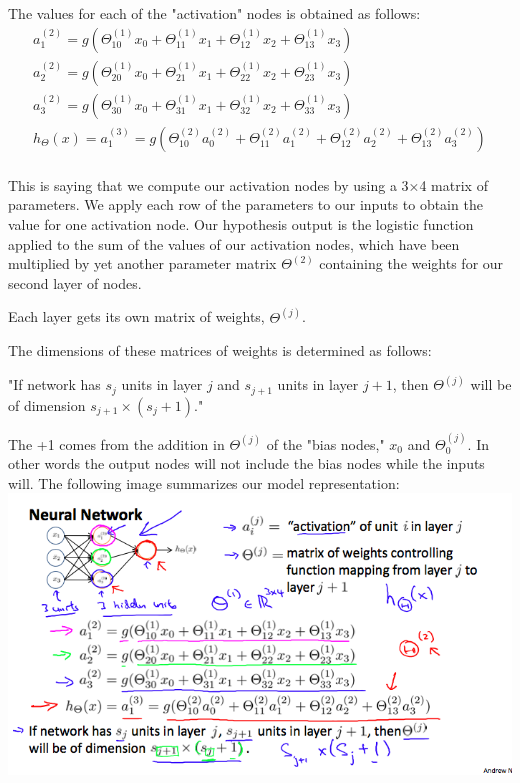 \documentclass{report}
\begin{document}
The values for each of the "activation" nodes is obtained as follows:
\begin{align*} 
	a_1^{(2)} = g(\Theta_{10}^{(1)}x_0 + \Theta_{11}^{(1)}x_1 + \Theta_{12}^{(1)}x_2 + \Theta_{13}^{(1)}x_3) \\ 
	a_2^{(2)} = g(\Theta_{20}^{(1)}x_0 + \Theta_{21}^{(1)}x_1 + \Theta_{22}^{(1)}x_2 + \Theta_{23}^{(1)}x_3) \\ 
	a_3^{(2)} = g(\Theta_{30}^{(1)}x_0 + \Theta_{31}^{(1)}x_1 + \Theta_{32}^{(1)}x_2 + \Theta_{33}^{(1)}x_3) \\ 
	h_\Theta(x) = a_1^{(3)} = g(\Theta_{10}^{(2)}a_0^{(2)} + \Theta_{11}^{(2)}a_1^{(2)} + \Theta_{12}^{(2)}a_2^{(2)} + \Theta_{13}^{(2)}a_3^{(2)}) \\ 
\end{align*}

This is saying that we compute our activation nodes by using a 3×4 matrix of parameters. We apply each row of the parameters to our inputs to obtain the value for one activation node. Our hypothesis output is the logistic function applied to the sum of the values of our activation nodes, which have been multiplied by yet another parameter matrix $\Theta^{(2)}$ containing the weights for our second layer of nodes.

Each layer gets its own matrix of weights, $\Theta^{(j)}$.

The dimensions of these matrices of weights is determined as follows:

"If network has $s_j$ units in layer $j$ and $s_{j+1}$ units in layer $j+1$, then $\Theta^{(j)}$ will be of dimension $s_{j+1} \times (s_j + 1)$."

The +1 comes from the addition in $\Theta^{(j)}$ of the "bias nodes," $x_0$ and $\Theta_0^{(j)}$. In other words the output nodes will not include the bias nodes while the inputs will. The following image summarizes our model representation:\\
\includegraphics[width=\textwidth]{model_representation.png}
 
\end{document}
